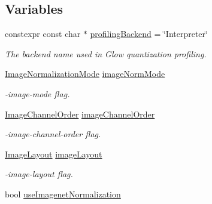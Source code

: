 \subsection*{Variables}
\begin{DoxyCompactItemize}
\item 
\mbox{\label{namespaceglow_aead878efec317164091814dc580e53bf}} 
constexpr const char $\ast$ \hyperlink{namespaceglow_aead878efec317164091814dc580e53bf}{profiling\+Backend} = \char`\"{}Interpreter\char`\"{}
\begin{DoxyCompactList}\small\item\em The backend name used in Glow quantization profiling. \end{DoxyCompactList}\item 
\mbox{\label{namespaceglow_ad1aa614344d723c1b14942f55e0a92b4}} 
\hyperlink{namespaceglow_af836699afb1d36a88df0d50d74fde931}{Image\+Normalization\+Mode} \hyperlink{namespaceglow_ad1aa614344d723c1b14942f55e0a92b4}{image\+Norm\+Mode}
\begin{DoxyCompactList}\small\item\em -\/image-\/mode flag. \end{DoxyCompactList}\item 
\mbox{\label{namespaceglow_a3f89e6d465a90abbf0dd62935035c1de}} 
\hyperlink{namespaceglow_a2747942676633510584a944637b8eb59}{Image\+Channel\+Order} \hyperlink{namespaceglow_a3f89e6d465a90abbf0dd62935035c1de}{image\+Channel\+Order}
\begin{DoxyCompactList}\small\item\em -\/image-\/channel-\/order flag. \end{DoxyCompactList}\item 
\mbox{\label{namespaceglow_a53107002ac2c9f4c49145ee80843a1da}} 
\hyperlink{namespaceglow_a06c384b9844d09e4dd277eb509728dce}{Image\+Layout} \hyperlink{namespaceglow_a53107002ac2c9f4c49145ee80843a1da}{image\+Layout}
\begin{DoxyCompactList}\small\item\em -\/image-\/layout flag. \end{DoxyCompactList}\item 
\mbox{\label{namespaceglow_ae2953fbb5442af152c75ab1643f856d6}} 
bool \hyperlink{namespaceglow_ae2953fbb5442af152c75ab1643f856d6}{use\+Imagenet\+Normalization}

\end{DoxyCompactItemize}
